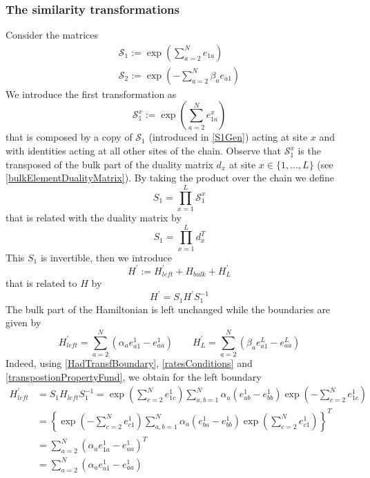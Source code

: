 \documentclass[10pt]{article}
\numberwithin{equation}{section}
\numberwithin{equation}{subsection}
\begin{document}
\subsubsection{The similarity transformations}\label{subsectionSTransf}
Consider the matrices
\begin{align}
	\mathcal{S}_{1}:=\exp{\left(\sum_{a=2}^{N}e_{1a}\right)}\label{S1Gen}\\
	\mathcal{S}_{2}:=\exp{\left(-\sum_{a=2}^{N}\beta_{a}e_{a1}\right)}\label{S2Gen}
\end{align}
We introduce the first transformation as
\begin{equation}\label{transformationV}
 \mathcal{S}_{1}^{x}:=\exp{\left(\sum_{a=2}^{N}e_{1a}^{x}\right)}%
\end{equation}
that is composed by a copy of $\mathcal{S}_{1}$ (introduced in \eqref{S1Gen}) acting at site $x$ and with identities acting at all other sites of the chain. 
Observe that $\mathcal{S}_{1}^{x}$ is the transposed of the bulk part of the duality matrix $d_{x}$  at site $x\in \{1,\ldots,L\}$ (see \eqref{bulkElementDualityMatrix}). By taking the product over the chain we define
\begin{equation}\label{S1-Whole}
    S_{1}=\prod_{x=1}^{L}\mathcal{S}_{1}^{x}
\end{equation}
that is related with the duality matrix by 
\begin{equation}
S_{1}=\prod_{x=1}^{L}d_{x}^{T}
\end{equation}
 This $S_{1}$ is invertible, then we introduce 
\begin{equation}\label{hatHamiltonian}
   H^{'}:=H^{'}_{left}+H_{bulk}+H^{'}_{L}
\end{equation}
that is related to $H$ by
\begin{equation}\label{similarV}
   H^{'}=S_{1}H^{'}S_{1}^{-1}
\end{equation}
The bulk part of the Hamiltonian is left unchanged while the boundaries are given by 
\begin{equation}
	H^{'}_{left}=\sum_{a=2}^{N}\left(\alpha_{a}e_{a1}^{1}-e_{aa}^{1}\right)\qquad H^{'}_{L}=\sum_{a=2}^{N}\left(\beta_{a}e_{a1}^{L}-e_{aa}^{L}\right)
\end{equation}
Indeed, using \eqref{HadTransfBoundary}, \eqref{ratesConditions} and \eqref{transpostionPropertyFund}, we obtain for the left boundary
\begin{equation}
	\begin{split}
		H_{left}^{'}&=S_{1}H_{left}S_{1}^{-1}=\exp{\left(\sum_{c=2}^{N}e_{1c}^{1}\right)}\sum_{a,b=1}^{N}\alpha_{a}\left(e_{ab}^{1}-e_{bb}^{1}\right)\exp{\left(-\sum_{c=2}^{N}e_{1c}^{1}\right)}
		\\&=
		\left\{\exp{\left(-\sum_{c=2}^{N}e_{c1}^{1}\right)}\sum_{a,b=1}^{N}\alpha_{a}\left(e_{ba}^{1}-e_{bb}^{1}\right)\exp{\left(\sum_{c=2}^{N}e_{c1}^{1}\right)}\right\}^{T}
		\\&=
		\sum_{a=2}^{N}\left(\alpha_{a}e_{1a}^{1}-e_{aa}^{1}\right)^{T}
		\\&=
		\sum_{a=2}^{N}\left(\alpha_{a}e_{a1}^{1}-e_{aa}^{1}\right)
	\end{split}
\end{equation}
\end{document}
